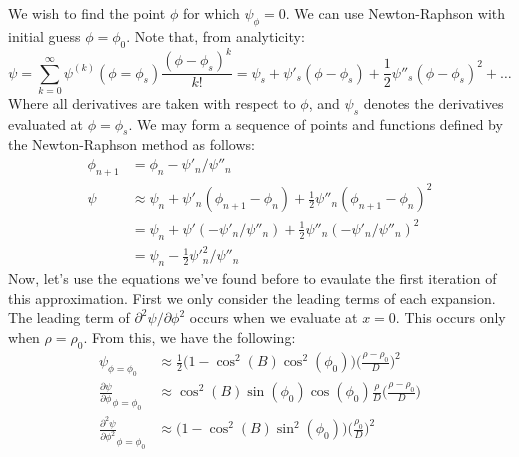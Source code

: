            We wish to find the point $\phi$ for which
            $\psi_{\phi}=0$. We can use Newton-Raphson
            with initial guess
            $\phi=\phi_{0}$. Note that, from analyticity:
            \begin{equation*}
                \psi=\sum_{k=0}^{\infty}
                     \psi^{(k)}(\phi=\phi_{s})
                     \frac{(\phi-\phi_{s})^{k}}{k!}
                    =\psi_{s}+\psi'_{s}(\phi-\phi_{s})
                    +\frac{1}{2}\psi''_{s}(\phi-\phi_{s})^{2}
                    +\hdots
            \end{equation*}
            Where all derivatives are taken with respect to
            $\phi$, and $\psi_{s}$ denotes the derivatives
            evaluated at $\phi=\phi_{s}$.
            We may form a sequence of points and
            functions defined by
            the Newton-Raphson method as follows:
            \begin{align*}
                \phi_{n+1}&=\phi_{n}-\psi'_{n}/\psi''_{n}\\
                \psi&\approx
                \psi_{n}+\psi'_{n}(\phi_{n+1}-\phi_{n})
                +\frac{1}{2}\psi''_{n}(\phi_{n+1}-\phi_{n})^{2}\\
                &=\psi_{n}+\psi'(-\psi'_{n}/\psi''_{n})
                 +\frac{1}{2}
                  \psi''_{n}(-\psi'_{n}/\psi''_{n})^{2}\\
                &=\psi_{n}-\frac{1}{2}\psi'^{2}_{n}/\psi''_{n}
            \end{align*}
            Now, let's use the equations we've found before
            to evaulate the first iteration of this
            approximation. First we only consider the
            leading terms of each expansion. The leading term
            of $\partial^{2}\psi/\partial\phi^{2}$ occurs
            when we evaluate at $x=0$. This occurs only
            when $\rho=\rho_{0}$. From this, we have the
            following:
            \begin{align*}
                \psi_{\phi=\phi_{0}}
                &\approx
                    \frac{1}{2}\big(
                        1-\cos^{2}(B)\cos^{2}(\phi_{0})
                    \big)
                    \Big(\frac{\rho-\rho_{0}}{D}\Big)^{2}\\
                \frac{\partial\psi}
                     {\partial\phi}_{\phi=\phi_{0}}
                &\approx
                    \cos^{2}(B)\sin(\phi_{0})\cos(\phi_{0})
                    \frac{\rho}{D}
                    \Big(\frac{\rho-\rho_{0}}{D}\Big)\\
                \frac{\partial^{2}\psi}
                     {\partial\phi^{2}}_{\phi=\phi_{0}}
                &\approx
                    \big(1-\cos^{2}(B)\sin^{2}(\phi_{0})\big)
                    \Big(\frac{\rho_{0}}{D}\Big)^{2}
            \end{align*}
